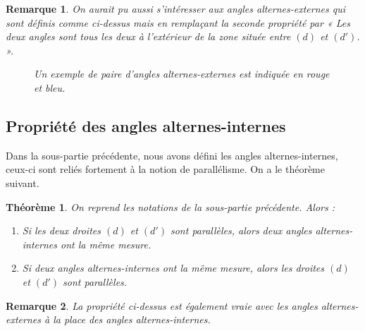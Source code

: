 \documentclass[12 pt]{article}
\theoremstyle{plain}
\newcounter{n}
\numberwithin{n}{section}
\newtheorem{theo}{Théorème}
\newtheorem*{rmq}{Remarque}
\begin{document}
\begin{rmq}
On aurait pu aussi s'intéresser aux angles \emph{alternes-externes} qui sont définis comme ci-dessus mais en 
remplaçant la seconde propriété par « Les deux angles sont tous les deux à l'extérieur de la zone située entre $(d)$ et $(d')$. ».



\begin{figure}[H]\center
{}
\caption{ Un exemple de paire d'angles alternes-externes est indiquée en rouge et bleu.}
\end{figure}

\end{rmq}

\subsection{Propriété des angles alternes-internes}

Dans la sous-partie précédente, nous avons défini les angles alternes-internes, ceux-ci sont reliés 
fortement à la notion de parallélisme. 
On a le 
théorème suivant. 

\begin{theo}
On reprend les notations de la sous-partie précédente. Alors : 
\begin{enumerate}
\item Si les deux droites $(d)$ et $(d')$ sont parallèles, alors deux angles alternes-internes ont la même mesure.
\item Si deux angles alternes-internes ont la même mesure, alors les droites $(d)$ et $(d')$ sont parallèles.  
\end{enumerate}
\end{theo}
\begin{rmq}
La propriété ci-dessus est également vraie avec les angles alternes-externes à la place des angles alternes-internes. 
\end{rmq}
\end{document}
